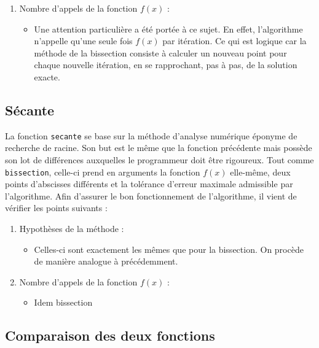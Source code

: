 \documentclass[12pt]{article}
\begin{document}
\begin{enumerate}[label=\roman*.]
\begin{itemize}
                \end{itemize}
            
            \item 
            Nombre d'appels de la fonction $f(x)$ :
                \begin{itemize}
                    \item Une attention particulière a été portée à ce sujet. En effet, l'algorithme n'appelle qu'une seule fois $f(x)$ par itération. Ce qui est logique car la méthode de la bissection consiste à calculer un nouveau point pour chaque nouvelle itération, en se rapprochant, pas à pas, de la solution exacte.
                \end{itemize}
        \end{enumerate}
    
    \subsection{Sécante}
        La fonction \texttt{secante} se base sur la méthode d'analyse numérique éponyme de recherche de racine. Son but est le même que la fonction précédente mais possède son lot de différences auxquelles le programmeur doit être rigoureux. Tout comme \texttt{bissection}, celle-ci prend en arguments la fonction $f(x)$ elle-même, deux points d'abscisses différents et la tolérance d'erreur maximale admissible par l'algorithme. Afin d'assurer le bon fonctionnement de l'algorithme, il vient de vérifier les points suivants :
    \begin{enumerate}[label=\roman*.]
        \item Hypothèses de la méthode : 
            \begin{itemize}
                \item Celles-ci sont exactement les mêmes que pour la bissection. On procède de manière analogue à précédemment.
            \end{itemize}
            
        \item 
        Nombre d'appels de la fonction $f(x)$ : 
            \begin{itemize}
                \item Idem bissection
            \end{itemize}
            
    \end{enumerate}
    
    \subsection{Comparaison des deux fonctions}
    
\end{document}
